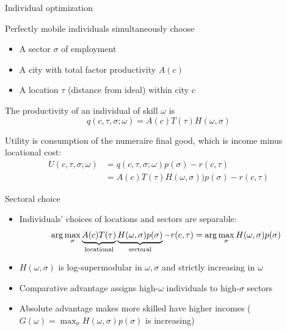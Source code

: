 \documentclass[10pt,notes=hide]{beamer}
\begin{document}
\begin{frame}{Individual optimization}

Perfectly mobile individuals simultaneously choose
\begin{itemize}
\item A sector $\sigma$ of employment
\item A city with total factor productivity $A(c)$
\item A location $\tau$ (distance from ideal) within city $c$
\end{itemize}
The productivity of an individual of skill $\omega$ is
\[
q(c,\tau,\sigma;\omega)=A(c)T(\tau)H(\omega,\sigma)
\]


Utility is consumption of the numeraire final good, which is income minus locational cost:
\begin{align*}
U(c,\tau,\sigma;\omega) & =q(c,\tau,\sigma;\omega)p(\sigma)-r(c,\tau)\\
 & =A(c)T(\tau)H(\omega,\sigma))p(\sigma)-r(c,\tau)
\end{align*}



\end{frame}


\begin{frame}{Sectoral choice}
\begin{itemize}
\item Individuals' choices of locations and sectors are separable: 
\begin{align*}
\arg\max_{\sigma}\underbrace{A(c)T(\tau)}_{\textnormal{locational}}\underbrace{H(\omega,\sigma)p(\sigma)}_{\textnormal{sectoral}}-r(c,\tau)=\arg\max_{\sigma}H(\omega,\sigma)p(\sigma)
\end{align*}

\item $H(\omega,\sigma)$ is log-supermodular in $\omega,\sigma$ and strictly increasing in $\omega$
\item Comparative advantage assigns high-$\omega$ individuals to high-$\sigma$ sectors
\item Absolute advantage makes more skilled have higher incomes ($G(\omega)=\max_{\sigma}H(\omega,\sigma)p(\sigma)$
is increasing)
\end{itemize}

\end{frame}
\end{document}
